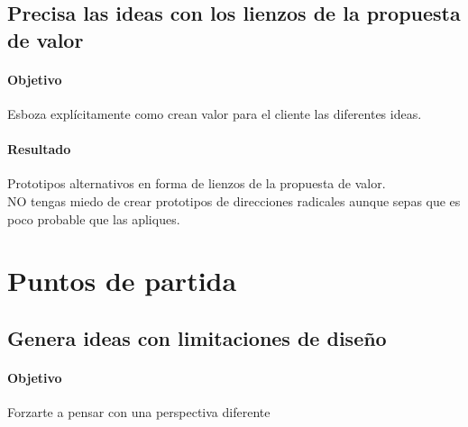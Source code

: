 \documentclass[11pt]{book}
\begin{document}
\subsection{Precisa las ideas con los lienzos de la propuesta de valor}
\paragraph{Objetivo}
Esboza explícitamente como crean valor para el cliente las diferentes ideas.
\paragraph{Resultado}
Prototipos alternativos en forma de lienzos de la propuesta de valor.
\\ NO tengas miedo de crear prototipos de direcciones radicales aunque sepas que es poco probable que las apliques.
\section{Puntos de partida}

\subsection{Genera ideas con limitaciones de diseño}
\paragraph{Objetivo}
Forzarte a pensar con una perspectiva diferente
\end{document}
